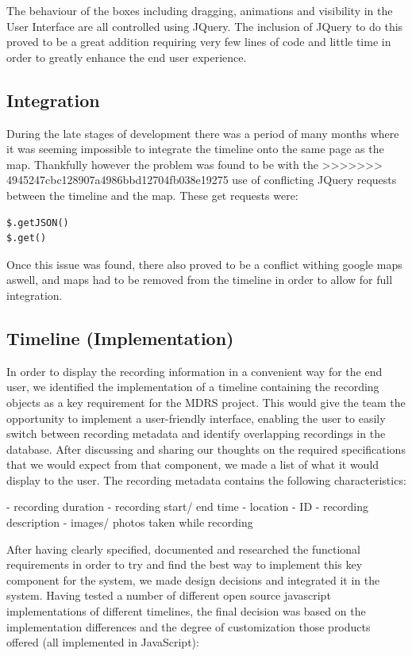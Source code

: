 \documentclass{l3proj}
\begin{document}
The behaviour of the boxes including dragging, animations and visibility 
in the User Interface are all controlled using JQuery. The inclusion of 
JQuery to do this proved to be a great addition requiring very few 
lines of code and little time in order to greatly enhance the end user
experience.

\subsection{Integration} 

During the late stages of development there was a period of many months
where it was seeming impossible to integrate the timeline onto the same
page as the map. Thankfully however the problem was found to be with the
>>>>>>> 4945247cbc128907a4986bbd12704fb038e19275
use of conflicting JQuery requests between the timeline and the
map. These get requests were:
\begin{verbatim}
$.getJSON()
$.get()
\end{verbatim}
Once this issue was found, there also proved to be a conflict withing
google maps aswell, and maps had to be removed from the timeline in
order to allow for full integration.


\subsection{Timeline (Implementation)}

In order to display the recording information in a convenient way for the end user, we identified the implementation of a timeline containing the recording objects as a key requirement for the MDRS project. This would give the team the opportunity to implement a user-friendly interface, enabling the user to easily switch between recording metadata and identify overlapping recordings in the database. After discussing and sharing our thoughts on the required specifications that we would expect from that component, we made a list of what it would display to the user. The recording metadata contains the following characteristics:

- recording duration
- recording start/ end time
- location
- ID
- recording description
- images/ photos taken while recording

After having clearly specified, documented and researched the functional requirements in order to try and find the best way to implement this key component for the system, we made design decisions and integrated it in the system. Having tested a number of different open source javascript implementations of different timelines, the final decision was based on the implementation differences and the degree of customization those products offered (all implemented in JavaScript):
\end{document}
